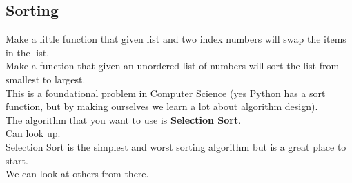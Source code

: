 \documentclass[a4paper,12pt]{article}
\begin{document}
\subsection{Sorting}
Make a little function that given list and two index numbers will swap the items in the list.\\

Make a function that given an unordered list of numbers will sort the list from smallest to largest.\\

This is a foundational problem in Computer Science (yes Python has a sort function, but by making ourselves we learn a lot about algorithm design).\\
The algorithm that you want to use is \textbf{Selection Sort}.\\
Can look up.\\
Selection Sort is the simplest and worst sorting algorithm but is a great place to start.\\
We can look at others from there.
\end{document}
